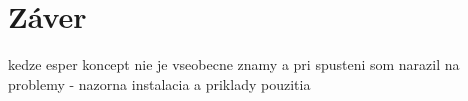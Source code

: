 \chapter*{Záver}

kedze esper koncept nie je vseobecne znamy a pri spusteni som narazil na problemy - nazorna instalacia a priklady pouzitia


\emptydoublepage